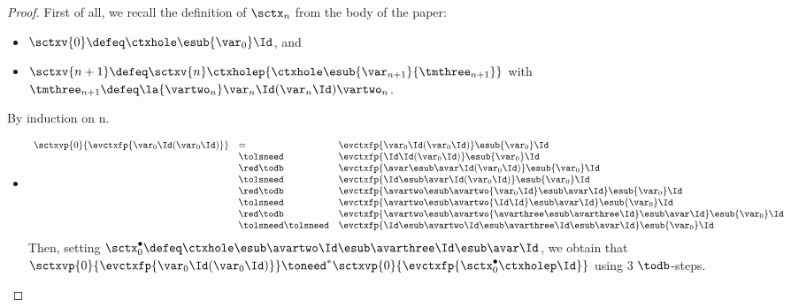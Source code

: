 
\begin{proof}
  First of all, we recall the definition of $\sctx_n$ from the body of the paper: 
  \begin{itemize}
  \item $\sctxv{0} \defeq \ctxhole\esub{\var_0}\Id$, and
  \item $\sctxv{n+1} \defeq \sctxv{n}\ctxholep{\ctxhole\esub{\var_{n+1}}{\tmthree_{n+1}}}$
with $\tmthree_{n+1} \defeq \la{\vartwo_n}\var_n\Id(\var_n\Id)\vartwo_n$.
\end{itemize}
By induction on n.
  \begin{itemize}
    \item {}
     \[\begin{array}{lll}
	\sctxvp{0}{\evctxfp{\var_0\Id(\var_0\Id)}}
	&= &\evctxfp{\var_0\Id(\var_0\Id)}\esub{\var_0}\Id \\
	&\tolsneed &\evctxfp{\Id\Id(\var_0\Id)}\esub{\var_0}\Id \\
	&\red\todb &\evctxfp{\avar\esub\avar\Id(\var_0\Id)}\esub{\var_0}\Id \\
	&\tolsneed &\evctxfp{\Id\esub\avar\Id(\var_0\Id)}\esub{\var_0}\Id \\
	&\red\todb &\evctxfp{\avartwo\esub\avartwo{\var_0\Id}\esub\avar\Id}\esub{\var_0}\Id \\
	&\tolsneed &\evctxfp{\avartwo\esub\avartwo{\Id\Id}\esub\avar\Id}\esub{\var_0}\Id \\
	&\red\todb &\evctxfp{
	    \avartwo\esub\avartwo{\avarthree\esub\avarthree\Id}
	\esub\avar\Id}\esub{\var_0}\Id \\
	&\tolsneed
	\tolsneed &\evctxfp{
	    \Id\esub\avartwo\Id\esub\avarthree\Id
	\esub\avar\Id}\esub{\var_0}\Id
      \end{array}\]
      Then, setting $\sctx^\bullet_0 \defeq \ctxhole
      \esub\avartwo\Id \esub\avarthree\Id \esub\avar\Id$,
      we obtain that $\sctxvp{0}{\evctxfp{\var_0\Id(\var_0\Id)}}
      \toneed^* \sctxvp{0}{\evctxfp{\sctx^\bullet_0\ctxholep\Id}}$ using $3$ $\todb$-steps.


\end{itemize}
\end{proof}
